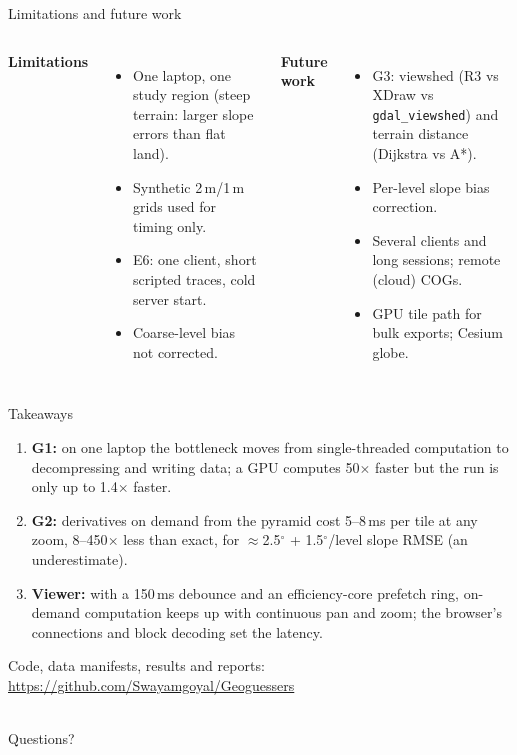 \documentclass[aspectratio=169,11pt]{beamer}
\begin{document}
\begin{frame}{Limitations and future work}
\begin{columns}[T]
\textbf{Limitations}
\small
\begin{itemize}
  \item One laptop, one study region (steep terrain: larger slope errors than flat land).
  \item Synthetic 2\,m/1\,m grids used for timing only.
  \item E6: one client, short scripted traces, cold server start.
  \item Coarse-level bias not corrected.
\end{itemize}
\textbf{Future work}
\small
\begin{itemize}
  \item G3: viewshed (R3 vs XDraw vs \texttt{gdal\_viewshed}) and terrain distance (Dijkstra vs A*).
  \item Per-level slope bias correction.
  \item Several clients and long sessions; remote (cloud) COGs.
  \item GPU tile path for bulk exports; Cesium globe.
\end{itemize}
\end{columns}
\end{frame}

\begin{frame}{Takeaways}
\begin{enumerate}
  \item \textbf{G1:} on one laptop the bottleneck moves from single-threaded computation to decompressing and writing
  data; a GPU computes 50$\times$ faster but the run is only up to 1.4$\times$ faster.
  \item \textbf{G2:} derivatives on demand from the pyramid cost 5--8\,ms per tile at any zoom, 8--450$\times$ less
  than exact, for $\approx$2.5$^\circ$ + 1.5$^\circ$/level slope RMSE (an underestimate).
  \item \textbf{Viewer:} with a 150\,ms debounce and an efficiency-core prefetch ring, on-demand computation keeps up
  with continuous pan and zoom; the browser's connections and block decoding set the latency.
\end{enumerate}
\vspace{8pt}
\centering\small Code, data manifests, results and reports: \url{https://github.com/Swayamgoyal/Geoguessers}
\end{frame}

\begin{frame}[plain]
\vfill{}\\[10pt]{\Large\color{ggblue} Questions?}\vfill
\end{frame}
\end{document}
